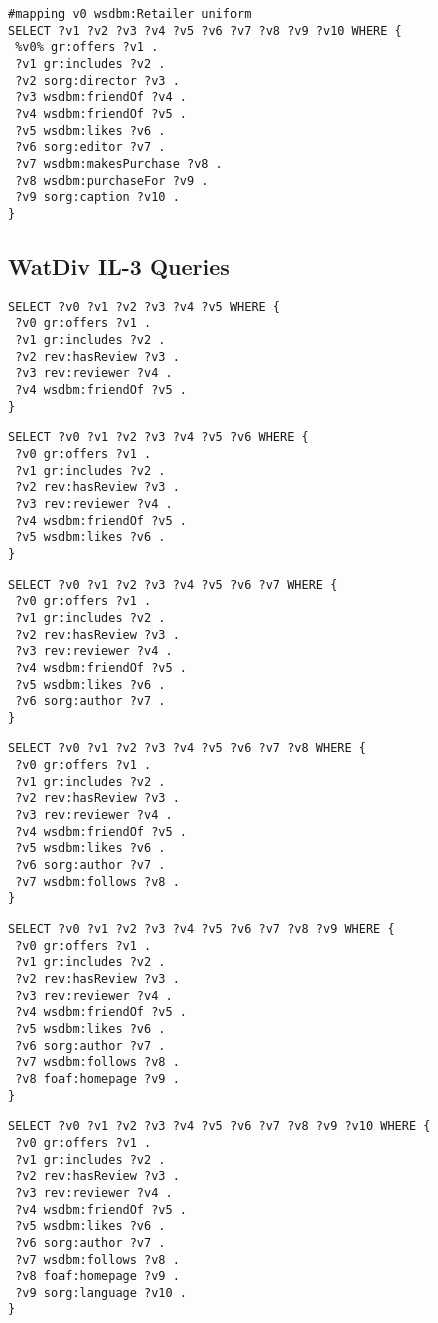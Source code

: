 \begin{lstlisting}[caption={IL-2-10},label=query:IL-2-10]
#mapping v0 wsdbm:Retailer uniform
SELECT ?v1 ?v2 ?v3 ?v4 ?v5 ?v6 ?v7 ?v8 ?v9 ?v10 WHERE {
 %v0% gr:offers ?v1 .
 ?v1 gr:includes ?v2 .
 ?v2 sorg:director ?v3 .
 ?v3 wsdbm:friendOf ?v4 .
 ?v4 wsdbm:friendOf ?v5 .
 ?v5 wsdbm:likes ?v6 .
 ?v6 sorg:editor ?v7 .
 ?v7 wsdbm:makesPurchase ?v8 .
 ?v8 wsdbm:purchaseFor ?v9 .
 ?v9 sorg:caption ?v10 .
}
\end{lstlisting}

\subsection{WatDiv IL-3 Queries} 

\begin{lstlisting}[caption={IL-3-5},label=query:IL-3-5]
SELECT ?v0 ?v1 ?v2 ?v3 ?v4 ?v5 WHERE {
 ?v0 gr:offers ?v1 .
 ?v1 gr:includes ?v2 .
 ?v2 rev:hasReview ?v3 .
 ?v3 rev:reviewer ?v4 .
 ?v4 wsdbm:friendOf ?v5 .
}
\end{lstlisting}

\begin{lstlisting}[caption={IL-3-7},label=query:IL-3-6]
SELECT ?v0 ?v1 ?v2 ?v3 ?v4 ?v5 ?v6 WHERE {
 ?v0 gr:offers ?v1 .
 ?v1 gr:includes ?v2 .
 ?v2 rev:hasReview ?v3 .
 ?v3 rev:reviewer ?v4 .
 ?v4 wsdbm:friendOf ?v5 .
 ?v5 wsdbm:likes ?v6 .
}
\end{lstlisting}

\begin{lstlisting}[caption={IL-3-7},label=query:IL-3-7]
SELECT ?v0 ?v1 ?v2 ?v3 ?v4 ?v5 ?v6 ?v7 WHERE {
 ?v0 gr:offers ?v1 .
 ?v1 gr:includes ?v2 .
 ?v2 rev:hasReview ?v3 .
 ?v3 rev:reviewer ?v4 .
 ?v4 wsdbm:friendOf ?v5 .
 ?v5 wsdbm:likes ?v6 .
 ?v6 sorg:author ?v7 .
}
\end{lstlisting}

\begin{lstlisting}[caption={IL-3-8},label=query:IL-3-8]
SELECT ?v0 ?v1 ?v2 ?v3 ?v4 ?v5 ?v6 ?v7 ?v8 WHERE {
 ?v0 gr:offers ?v1 .
 ?v1 gr:includes ?v2 .
 ?v2 rev:hasReview ?v3 .
 ?v3 rev:reviewer ?v4 .
 ?v4 wsdbm:friendOf ?v5 .
 ?v5 wsdbm:likes ?v6 .
 ?v6 sorg:author ?v7 .
 ?v7 wsdbm:follows ?v8 .
}
\end{lstlisting}

\begin{lstlisting}[caption={IL-3-9},label=query:IL-3-9]
SELECT ?v0 ?v1 ?v2 ?v3 ?v4 ?v5 ?v6 ?v7 ?v8 ?v9 WHERE {
 ?v0 gr:offers ?v1 .
 ?v1 gr:includes ?v2 .
 ?v2 rev:hasReview ?v3 .
 ?v3 rev:reviewer ?v4 .
 ?v4 wsdbm:friendOf ?v5 .
 ?v5 wsdbm:likes ?v6 .
 ?v6 sorg:author ?v7 .
 ?v7 wsdbm:follows ?v8 .
 ?v8 foaf:homepage ?v9 .
}
\end{lstlisting}

\begin{lstlisting}[caption={IL-3-10},label=query:IL-3-10]
SELECT ?v0 ?v1 ?v2 ?v3 ?v4 ?v5 ?v6 ?v7 ?v8 ?v9 ?v10 WHERE {
 ?v0 gr:offers ?v1 .
 ?v1 gr:includes ?v2 .
 ?v2 rev:hasReview ?v3 .
 ?v3 rev:reviewer ?v4 .
 ?v4 wsdbm:friendOf ?v5 .
 ?v5 wsdbm:likes ?v6 .
 ?v6 sorg:author ?v7 .
 ?v7 wsdbm:follows ?v8 .
 ?v8 foaf:homepage ?v9 .
 ?v9 sorg:language ?v10 .
}
\end{lstlisting}
